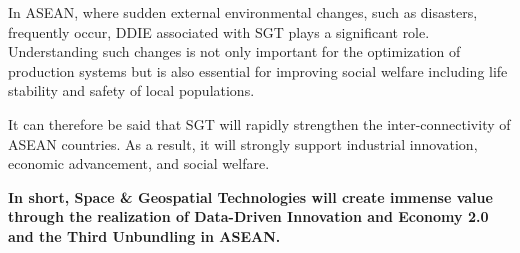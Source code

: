 \vspace{0.4 cm}

In ASEAN, where sudden external environmental changes, such as disasters, frequently occur, DDIE associated with SGT plays a significant role. Understanding such changes is not only important for the optimization of production systems but is also essential for improving social welfare including life stability and safety of local populations.

It can therefore be said that SGT will rapidly strengthen the inter-connectivity of ASEAN countries. As a result, it will strongly support industrial innovation, economic advancement, and social welfare.

\vspace{0.4 cm}

{\bfseries In short, Space \& Geospatial Technologies will create immense value through the realization of Data-Driven Innovation and Economy 2.0 and the Third Unbundling in ASEAN.}





















